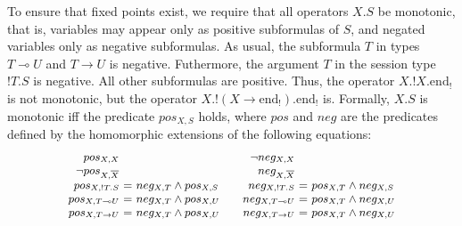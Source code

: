 \documentclass[orivec,envcountsame]{llncs}
\makeatletter
\newcommand{\gvdual}[1]{\overline{#1}}
\newcommand{\gvout}[2]{{!#1.#2}}
\newcommand{\lto}{\ensuremath{\multimap}}
\newcommand{\uto}{\ensuremath{\rightarrow}}
\newcommand{\outterm}{\mathrm{end}_!}
\newcommand{\ba}{\begin{array}}
\newcommand{\ea}{\end{array}}
\newenvironment{eqs}{\ba{@{}r@{~}c@{~}l@{}}}{\ea}
\makeatother
\begin{document}
To ensure that fixed points exist, we require that all operators $X.S$ be monotonic, that is,
variables may appear only as positive subformulas of $S$, and negated variables only as negative
subformulas. As usual, the subformula $T$ in types $T \lto U$ and $T \uto U$ is
negative. Futhermore, the argument $T$ in the session type $\gvout{T}{S}$ is negative. All other
subformulas are positive. Thus, the operator $X.\gvout{X}{\outterm}$ is not monotonic, but the
operator $X.\gvout{(X \uto \outterm)}{\outterm}$ is.
%
Formally, $X.S$ is monotonic iff the predicate $pos_{X,S}$ holds, where $pos$ and $neg$ are the
predicates defined by the homomorphic extensions of the following equations:
\[
\small
\ba{@{}c@{\qquad}c@{}}
\begin{eqs}
pos_{X,X} \\
\neg pos_{X,\gvdual{X}} \\
pos_{X,!T.S} &=& neg_{X,T} \wedge pos_{X,S} \\
pos_{X,T \lto U} &=& neg_{X,T} \wedge pos_{X,U} \\
pos_{X,T \uto U} &=& neg_{X,T} \wedge pos_{X,U} \\
\end{eqs}
&
\begin{eqs}
\neg neg_{X,X} \\
neg_{X,\gvdual{X}} \\
neg_{X,!T.S} &=& pos_{X,T} \wedge neg_{X,S} \\
neg_{X,T \lto U} &=& pos_{X,T} \wedge neg_{X,U} \\
neg_{X,T \uto U} &=& pos_{X,T} \wedge neg_{X,U} \\
\end{eqs}
\ea
\]
\end{document}
